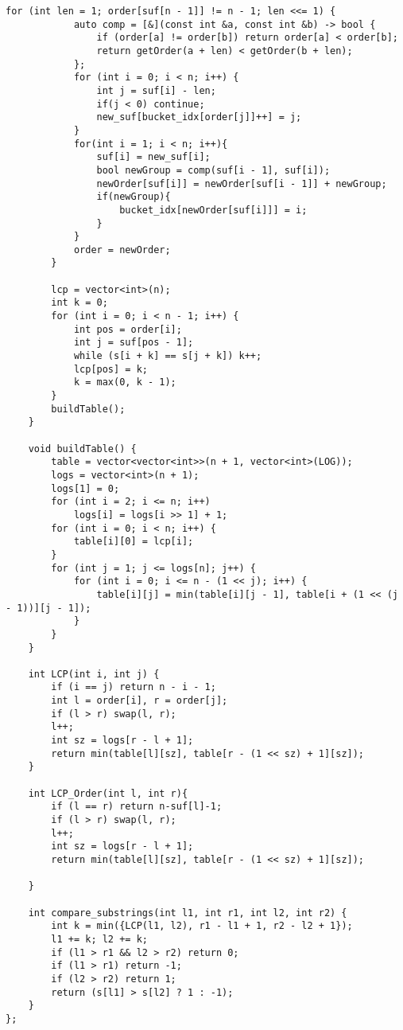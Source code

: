 {\begin{lstlisting}[style=cpp]
        for (int len = 1; order[suf[n - 1]] != n - 1; len <<= 1) {
            auto comp = [&](const int &a, const int &b) -> bool {
                if (order[a] != order[b]) return order[a] < order[b];
                return getOrder(a + len) < getOrder(b + len);
            };
            for (int i = 0; i < n; i++) {
                int j = suf[i] - len;
                if(j < 0) continue;
                new_suf[bucket_idx[order[j]]++] = j;
            }
            for(int i = 1; i < n; i++){
                suf[i] = new_suf[i];
                bool newGroup = comp(suf[i - 1], suf[i]);
                newOrder[suf[i]] = newOrder[suf[i - 1]] + newGroup;
                if(newGroup){
                    bucket_idx[newOrder[suf[i]]] = i;
                }
            }
            order = newOrder;
        }

        lcp = vector<int>(n);
        int k = 0;
        for (int i = 0; i < n - 1; i++) {
            int pos = order[i];
            int j = suf[pos - 1];
            while (s[i + k] == s[j + k]) k++;
            lcp[pos] = k;
            k = max(0, k - 1);
        }
        buildTable();
    }

    void buildTable() {
        table = vector<vector<int>>(n + 1, vector<int>(LOG));
        logs = vector<int>(n + 1);
        logs[1] = 0;
        for (int i = 2; i <= n; i++)
            logs[i] = logs[i >> 1] + 1;
        for (int i = 0; i < n; i++) {
            table[i][0] = lcp[i];
        }
        for (int j = 1; j <= logs[n]; j++) {
            for (int i = 0; i <= n - (1 << j); i++) {
                table[i][j] = min(table[i][j - 1], table[i + (1 << (j - 1))][j - 1]);
            }
        }
    }

    int LCP(int i, int j) {
        if (i == j) return n - i - 1;
        int l = order[i], r = order[j];
        if (l > r) swap(l, r);
        l++;
        int sz = logs[r - l + 1];
        return min(table[l][sz], table[r - (1 << sz) + 1][sz]);
    }

    int LCP_Order(int l, int r){
        if (l == r) return n-suf[l]-1;
        if (l > r) swap(l, r);
        l++;
        int sz = logs[r - l + 1];
        return min(table[l][sz], table[r - (1 << sz) + 1][sz]);

    }

    int compare_substrings(int l1, int r1, int l2, int r2) {
        int k = min({LCP(l1, l2), r1 - l1 + 1, r2 - l2 + 1});
        l1 += k; l2 += k;
        if (l1 > r1 && l2 > r2) return 0;
        if (l1 > r1) return -1;
        if (l2 > r2) return 1;
        return (s[l1] > s[l2] ? 1 : -1);
    }
};
\end{lstlisting}

}
